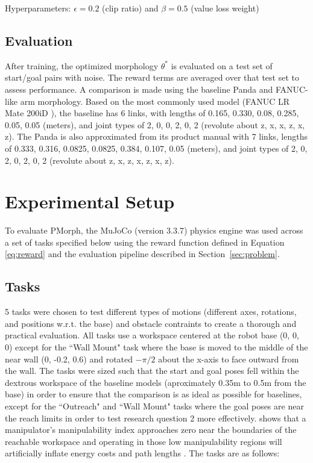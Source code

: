 \documentclass[defaultstyle,11pt]{thesis}
\begin{document}
Hyperparameters: \(\epsilon=0.2\) (clip ratio) and \(\beta=0.5\) (value loss weight)

\subsection{Evaluation}

After training, the optimized morphology \(\theta^*\) is evaluated on a test set of start/goal pairs with noise.
The reward terms are averaged over that test set to assess performance.
A comparison is made using the baseline Panda and FANUC-like arm morphology.
Based on the most commonly used model (FANUC LR Mate 200iD \cite{fanuc2024lrmate}), the baseline has 6 links, with lengths of 0.165, 0.330, 0.08, 0.285, 0.05, 0.05 (meters), and joint types of 2, 0, 0, 2, 0, 2 (revolute about z, x, x, z, x, z).
The Panda is also approximated from its product manual \cite{franka2024research3} with 7 links, lengths of 0.333, 0.316, 0.0825, 0.0825, 0.384, 0.107, 0.05 (meters), and joint types of 2, 0, 2, 0, 2, 0, 2 (revolute about z, x, z, x, z, x, z).

\section{Experimental Setup}

To evaluate PMorph, the MuJoCo (version 3.3.7) physics engine was used across a set of tasks specified below using the reward function defined in Equation \eqref{eq:reward} and the evaluation pipeline described in Section~\ref{sec:problem}.

\subsection{Tasks}

5 tasks were chosen to test different types of motions (different axes, rotations, and positions w.r.t. the base) and obstacle contraints to create a thorough and practical evaluation. 
All tasks use a workspace centered at the robot base (0, 0, 0) except for the ``Wall Mount" task where the base is moved to the middle of the near wall (0, -0.2, 0.6) and rotated $-\pi/2$ about the x-axis to face outward from the wall.
The tasks were sized such that the start and goal poses fell within the dextrous workspace of the baseline models (aproximately 0.35m to 0.5m from the base) in order to ensure that the comparison is as ideal as possible for baselines, except for the ``Outreach" and ``Wall Mount" tasks where the goal poses are near the reach limits in order to test research question 2 more effectively.
\cite{yoshikawa1985manipulability} shows that a manipulator's manipulability index approaches zero near the boundaries of the reachable workspace and operating in those low manipulability regions will artificially inflate energy costs and path lengths \cite{vahrenkamp2012manipulability}.
The tasks are as follows:
\end{document}
